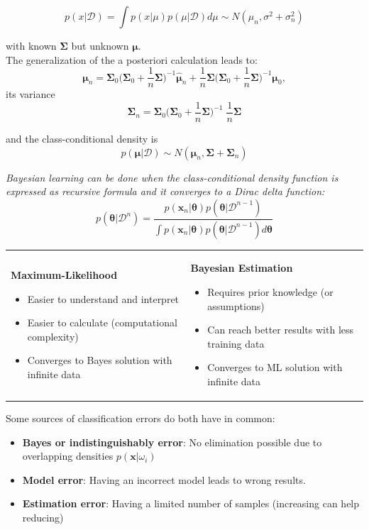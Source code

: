   $$p(x|\mathcal{D}) = \int p(x|\mu) p(\mu|\mathcal{D}) d\mu \sim N(\mu_n, \sigma^2+\sigma_n^2)$$ 
    
  with known $\bm\Sigma$ but unknown $\bm{\mu}$.\\
  The generalization of the a posteriori calculation leads to:
  $$\bm{\mu}_n = \bm{\Sigma}_0 \Big(\bm{\Sigma}_0 + \frac1n \bm{\Sigma}\Big)^{-1}\bm{\hat{\mu}}_n +
    \frac1n \bm{\Sigma} \Big(\bm{\Sigma}_0 + \frac1n \bm{\Sigma}\Big)^{-1} \bm{\mu}_0,$$
  its variance
  $$\bm{\Sigma}_n = \bm{\Sigma}_0 \Big( \bm{\Sigma}_0 + 
    \frac1n \bm{\Sigma}\Big)^{-1}\; \frac1n{\bm{\Sigma}}$$
  
  and the class-conditional density is
  $$p(\bm{\mu}|\mathcal{D}) \sim N(\bm{\mu}_n, \bm{\Sigma} + \bm{\Sigma}_n)$$
  
  \em Bayesian learning \em can be done when the class-conditional density function is expressed 
  as recursive formula and it converges to a Dirac delta function:
  $$p(\bm{\theta} | \mathcal{D}^n) = \frac{p(\bm{x}_n|\bm{\theta}) p(\bm{\theta}| \mathcal{D}^{n-1})}
  {\int p(\bm{x}_n|\bm{\theta}) p(\bm{\theta}|\mathcal{D}^{n-1}) d\bm{\theta}}$$
  
  
  \begin{tabular}{ll}
    \parbox{9cm}{
      \textbf{Maximum-Likelihood}
      \begin{itemize}
        \item Easier to understand and interpret
        \item Easier to calculate (computational complexity)
        \item Converges to Bayes solution with infinite data
      \end{itemize}
    }
    & \parbox{9cm}{
      \textbf{Bayesian Estimation}
      \begin{itemize}
        \item Requires prior knowledge (or assumptions)
        \item Can reach better results with less training data
        \item Converges to ML solution with infinite data
      \end{itemize}
    }
  \end{tabular}
  
  Some sources of classification errors do both have in common:
  \begin{itemize}
    \item \textbf{Bayes or indistinguishably error}: No elimination possible due to overlapping
    densities $p(\bm{x}|\omega_i)$
  	\item \textbf{Model error}: Having an incorrect model leads to wrong results.
  	\item \textbf{Estimation error}: Having a limited number of samples (increasing can help reducing)
  \end{itemize}
  
